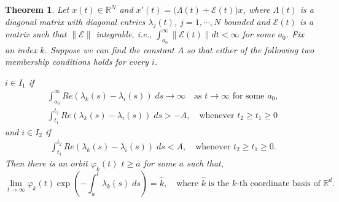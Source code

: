 \documentclass[a4paper,11pt]{article}
\newcounter{Theorem}
\newtheorem{theorem}[Theorem]{Theorem}
\theoremstyle{remark}
\begin{document}
\begin{theorem}{\cite[Levinson's Theorem]{CL55}}\label{thm:CL} Let $x(t)\in \mathbb{R}^N$ and $x'(t) = \big(\Lambda(t) + \mathcal{E}(t)\big)x$, where $\Lambda(t)$ is a diagonal matrix with diagonal entries $\lambda_j(t)$, $j=1,\cdots,N$ bounded and $\mathcal{E}(t)$ is a matrix such that $\|\mathcal{E}\|$ integrable, i.e., $\int_{a_0}^\infty \|\mathcal{E}(t)\| dt < \infty$ for some $a_0$.
Fix an index $k$. Suppose we can find the constant $A$ so that either of the following two membership conditions holds for every $i$.

$i \in I_1$ if
\begin{align}
 &\int_{a_0}^\infty Re(\lambda_k(s) -\lambda_i(s))\; ds \rightarrow \infty \quad \text{as $t \rightarrow \infty$ for some $a_0$},\label{eq:I1cond1}\\
 &\int_{t_1}^{t_2} Re(\lambda_k(s) -\lambda_i(s))\; ds > -A, \quad \text{whenever $t_2\ge t_1\ge 0$} \label{eq:I1cond2}
\end{align}
and $i \in I_2$ if
\begin{align}
 &\int_{t_1}^{t_2} Re(\lambda_k(s) -\lambda_i(s))\; ds < A, \quad \text{whenever $t_2\ge t_1\ge 0$}. \label{eq:I2cond}
\end{align}
Then there is an orbit $\varphi_k(t)$ $t\ge a$ for some $a$ such that,
\begin{equation}
 \lim_{t \rightarrow \infty} \varphi_k(t) \exp\left(-\int_{a}^t \lambda_k(s)\; ds\right) = \hat{k}, \quad \text{where $\hat{k}$ is the $k$-th coordinate basis of $\mathbb{R}^d$.}
\end{equation}
\end{theorem}
\end{document}
